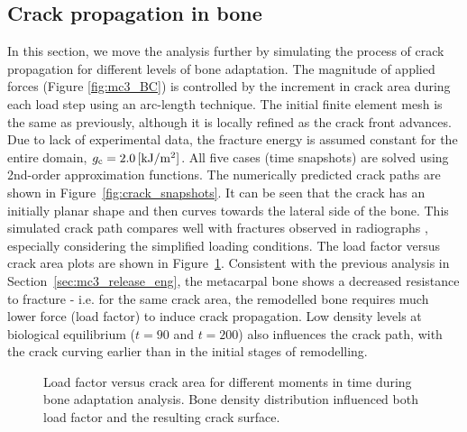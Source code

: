 \documentclass[onecolumn]{svjour3}
\begin{document}
\subsection{Crack propagation in bone}
In this section, we move the analysis further by simulating the process of crack propagation for different levels of bone adaptation. The magnitude of applied forces (Figure \ref{fig:mc3_BC}) is controlled by the increment in crack area during each load step using an arc-length technique. The initial finite element mesh is the same as previously, although it is locally refined as the crack front advances. Due to lack of experimental data, the fracture energy is assumed constant for the entire domain, $g_{\text c} = 2.0\,[\mathrm{ kJ/m^2}]$. 
All five cases (time snapshots) are solved using 2nd-order approximation functions.
The numerically predicted crack paths are shown in Figure~\ref{fig:crack_snapshots}. 
It can be seen that the crack has an initially planar shape and then curves towards the lateral side of the bone. This simulated crack path compares well with fractures observed in radiographs \cite{whitton2010third}, especially considering the simplified loading conditions. The load factor versus crack area plots are shown in Figure~\ref{fig:crack_remodel_frac_compar}. Consistent with the previous analysis in Section~\ref{sec:mc3_release_eng}, the metacarpal bone shows a decreased resistance to fracture - i.e. for the same crack area, the remodelled bone requires much lower force (load factor) to induce crack propagation. Low density levels at biological equilibrium ($t=90$ and $t=200$) also influences the crack path, with the crack curving earlier than in the initial stages of remodelling. 
\begin{figure}[h!]
	\centering
	\caption{Load factor versus crack area for different moments in time during bone adaptation analysis. Bone density distribution influenced both load factor and the resulting crack surface.}
	\label{fig:crack_remodel_frac_compar}
\end{figure}
\end{document}
